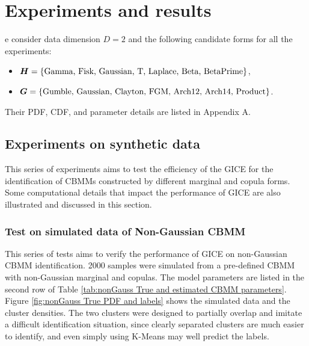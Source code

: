 \section{Experiments and results}
\label{sec:Experiments}

e consider data dimension $D=2$ and the following candidate forms for all the experiments:
\begin{itemize}
    \item[] $\boldsymbol{H} = \left\{\text{Gamma, Fisk, Gaussian, T, Laplace, Beta, BetaPrime}\right\}$,
    \item[] $\boldsymbol{G} = \left\{\text{Gumble, Gaussian, Clayton, FGM, Arch12, Arch14, Product}\right\}$.
\end{itemize}
Their PDF, CDF, and parameter details are listed in Appendix A.

\subsection{Experiments on synthetic data}
\label{sec:Experimentation on synthetic data}

This series of experiments aims to test the efficiency of the GICE for the identification of CBMMs constructed by different marginal and copula forms. Some computational details that impact the performance of GICE are also illustrated and discussed in this section.

\subsubsection{Test on simulated data of Non-Gaussian CBMM}
\label{sec:Test on simulated data of Non-Gaussian CBMM}
This series of tests aims to verify the performance of GICE on non-Gaussian CBMM identification. 2000 samples were simulated from a pre-defined CBMM with non-Gaussian marginal and copulas. The model parameters are listed in the second row of Table \ref{tab:nonGauss True and estimated CBMM parameters}. Figure \ref{fig:nonGauss True PDF and labels} shows the simulated data and the cluster densities. The two clusters 
were designed to partially overlap and imitate a difficult identification situation, since clearly separated clusters are much easier to identify, and even simply using K-Means may well predict the labels.

